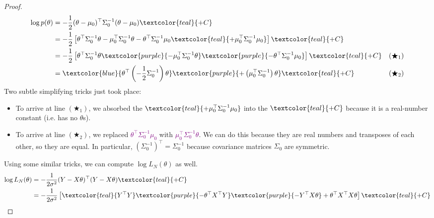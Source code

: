 \begin{proof}
    \begin{align*}
        \log p(\theta)
        & = -\frac{1}{2}(\theta - \mu_0)^{\top}\Sigma_0^{-1}(\theta - \mu_0)
        \textcolor{teal}{+C} \\
        & = -\frac{1}{2}\left[\theta^{\top}\Sigma_0^{-1}\theta
        - \mu_0^{\top}\Sigma_0^{-1}\theta
        - \theta^{\top}\Sigma_0^{-1}\mu_0
        \textcolor{teal}{+ \mu_0^{\top}\Sigma_0^{-1}\mu_0}\right]
        \textcolor{teal}{+C} \\
        & = -\frac{1}{2}\left[\theta^{\top}\Sigma_0^{-1}\theta
        \textcolor{purple}{- \mu_0^{\top}\Sigma_0^{-1}\theta}
        \textcolor{purple}{- \theta^{\top}\Sigma_0^{-1}\mu_0}\right]
        \textcolor{teal}{+C} & (\bigstar_1) \\
        & = \textcolor{blue}{\theta^{\top}\left(
            -\frac{1}{2}\Sigma_0^{-1}
        \right)\theta}
        \textcolor{purple}{+ \left(\mu_0^{\top}\Sigma_0^{-1}\right)\theta}
        \textcolor{teal}{+C} & (\bigstar_2)
    \end{align*}
    Two subtle simplifying tricks just took place:
    \begin{itemize}
        \item To arrive at line $(\bigstar_1)$,
        we absorbed the $\textcolor{teal}{+ \mu_0^{\top}\Sigma_0^{-1}\mu_0}$
        into the $\textcolor{teal}{+C}$
        because it is a real-number constant (i.e. has no $\theta$s).
        \item To arrive at line $(\bigstar_2)$,
        we replaced \textcolor{purple}{$\theta^{\top}\Sigma_0^{-1}\mu_0$}
        with \textcolor{purple}{$\mu_0^{\top}\Sigma_0^{-1}\theta$}.
        We can do this because
        they are real numbers and transposes of each other,
        so they are equal.
        In particular, $(\Sigma_0^{-1})^{\top} = \Sigma_0^{-1}$
        because covariance matrices $\Sigma_0$ are symmetric.
    \end{itemize}
    Using some similar tricks,
    we can compute $\log L_N(\theta)$ as well.
    \begin{align*}
        \log L_N(\theta)
        & = -\frac{1}{2\sigma^2}(Y - X\theta)^{\top}(Y - X\theta)
        \textcolor{teal}{+C} \\
        & = -\frac{1}{2\sigma^2}\left[
            \textcolor{teal}{Y^{\top}Y}
            \textcolor{purple}{-\theta^{\top}X^{\top}Y}
            \textcolor{purple}{-Y^{\top}X\theta}
            + \theta^{\top}X^{\top}X\theta
        \right] \textcolor{teal}{+C} \\

\end{align*}
\end{proof}
